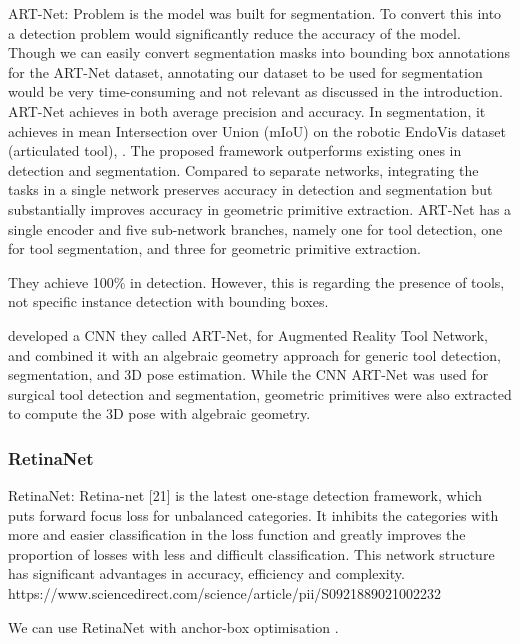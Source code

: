 ART-Net: Problem is the model was built for segmentation. To convert this into a detection problem would significantly reduce the accuracy of the model. Though we can easily convert segmentation masks into bounding box annotations for the ART-Net dataset, annotating our dataset to be used for segmentation would be very time-consuming and not relevant as discussed in the introduction.
ART-Net achieves in both average precision and accuracy. In segmentation, it achieves in mean Intersection over Union (mIoU) on the robotic EndoVis dataset (articulated tool), \cite{hasan_detection_2021}. The proposed framework outperforms existing ones in detection and segmentation. Compared to separate networks, integrating the tasks in a single network preserves accuracy in detection and segmentation but substantially improves accuracy in geometric primitive extraction. 
ART-Net has a single encoder and five sub-network branches, namely one for tool detection, one for tool segmentation, and three for geometric primitive extraction.

They achieve 100\% in detection. However, this is regarding the presence of tools, not specific instance detection with bounding boxes.

developed a CNN they called ART-Net, for Augmented Reality Tool Network, and combined it with an algebraic geometry approach for generic tool detection, segmentation, and 3D pose estimation. While the CNN ART-Net was used for surgical tool detection and segmentation, geometric primitives were also extracted to compute the 3D pose with algebraic geometry.

\subsubsection{RetinaNet}

RetinaNet: Retina-net [21] is the latest one-stage detection framework, which puts forward focus loss for unbalanced categories. It inhibits the categories with more and easier classification in the loss function and greatly improves the proportion of losses with less and difficult classification. This network structure has significant advantages in accuracy, efficiency and complexity. https://www.sciencedirect.com/science/article/pii/S0921889021002232

We can use RetinaNet with anchor-box optimisation \cite{zlocha2019improving}.

